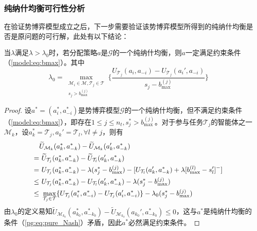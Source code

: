 \subsubsection{纯纳什均衡可行性分析}
\label{pg:mWLU:pgexist}
在验证势博弈模型成立之后，下一步需要验证该势博弈模型所得到的纯纳什均衡是否是原问题的可行解，此处有以下结论：

\begin{proposition}[纳什均衡可行性]
\label{pg:pro:feasibility}
	当$\lambda$满足$\lambda > \lambda_0$时，若分配策略$a$是$\mathcal{G}$的一个纯纳什均衡，则$a$一定满足约束条件（\ref{model:eq:bmax}）。其中
	\begin{equation}
		\lambda_0 = \max_{\substack{\mathcal{M}_i \in \mathcal{M}, \mathcal{T}_j \in \mathcal{T} \\ s_j > b_{\text{max}}^{(j)}}} \Bigg\{ \frac{U_{\mathcal{T}_j}(a_i,a_{-i}) - U_{\mathcal{T}_j}(a_i',a_{-i})}{s_j-b_{\text{max}}^{(j)}} \Bigg\}
	\end{equation}
	
	\begin{proof}
		设$a^*=(a_i^*,a_{-i}^*)$是势博弈模型$\mathcal{G}$的一个纯纳什均衡，但不满足约束条件（\ref{model:eq:bmax}），即存在$1\leq j \leq n_t, s_j^* > b_{\text{max}}^{(j)}$。对于参与任务$\mathcal{T}_j$的智能体之一$\mathcal{M}_k$，设$a_k^*=\mathcal{T}_j,a_k'=\mathcal{T}_l,\forall l \neq j$，则有
		\begin{align}
			&\widetilde U_{\mathcal{M}_k}(a_k^*,a_{-k}^*) - \widetilde U_{\mathcal{M}_k}(a_k',a_{-k}^*)\notag\\
		    =&\ \widetilde U_{\mathcal{T}_j}(a_k^*,a_{-k}^*) - \widetilde U_{\mathcal{T}_l}(a_k',a_{-k}^*)\notag\\
		    =&\ U_{\mathcal{T}_j}(a_k^*,a_{-k}^*) - \lambda(s_j^*-b_{\text{max}}^{(j)}) - [U_{\mathcal{T}_l}(a_k',a_{-k}^*) + \lambda[b_{\text{max}}^{(l)} - s_l']^-]\notag\\
		    \leq &\ U_{\mathcal{T}_j}(a_k^*,a_{-k}^*) - U_{\mathcal{T}_l}(a_k',a_{-k}^*) - \lambda(s_j^*-b_{\text{max}}^{(j)}) \notag \\
		    \leq &\ \max_{\mathcal{T}_j \in \mathcal{T}} \{U_{\mathcal{T}_j}(a_i^*,a_{-i}^*) - U_{\mathcal{T}_j}(a_i',a_{-i}^*)\} - \lambda_0(s_j^*-b_{\text{max}}^{(j)})
		\end{align}
		由$\lambda_0$的定义易知$\widetilde U_{\mathcal{M}_{k_0}}(a_{k_0}^*,a_{-{k_0}}^*) - \widetilde U_{\mathcal{M}_{k_0}}(a_{k_0}',a_{-{k_0}}^*) \leq 0$，这与$a^*$是纯纳什均衡的条件（\ref{pg:eq:pure_Nash}）矛盾，因此$a^*$必然满足约束条件。
	\end{proof}
	
\end{proposition}

